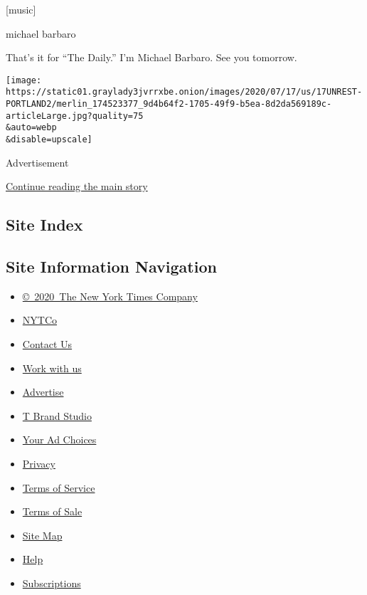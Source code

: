 {[}music{]}

michael barbaro

That's it for ``The Daily.'' I'm Michael Barbaro. See you tomorrow.

\texttt{[image: https://static01.graylady3jvrrxbe.onion/images/2020/07/17/us/17UNREST-PORTLAND2/merlin\_174523377\_9d4b64f2-1705-49f9-b5ea-8d2da569189c-articleLarge.jpg?quality=75\\\&auto=webp\\\&disable=upscale]}

Advertisement

\protect\hyperlink{after-bottom}{Continue reading the main story}

\hypertarget{site-index}{%
\subsection{Site Index}\label{site-index}}

\hypertarget{site-information-navigation}{%
\subsection{Site Information
Navigation}\label{site-information-navigation}}

\begin{itemize}
\tightlist
\item
  \href{https://help.nytimes3xbfgragh.onion/hc/en-us/articles/115014792127-Copyright-notice}{©~2020~The
  New York Times Company}
\end{itemize}

\begin{itemize}
\tightlist
\item
  \href{https://www.nytco.com/}{NYTCo}
\item
  \href{https://help.nytimes3xbfgragh.onion/hc/en-us/articles/115015385887-Contact-Us}{Contact
  Us}
\item
  \href{https://www.nytco.com/careers/}{Work with us}
\item
  \href{https://nytmediakit.com/}{Advertise}
\item
  \href{http://www.tbrandstudio.com/}{T Brand Studio}
\item
  \href{https://www.nytimes3xbfgragh.onion/privacy/cookie-policy\#how-do-i-manage-trackers}{Your
  Ad Choices}
\item
  \href{https://www.nytimes3xbfgragh.onion/privacy}{Privacy}
\item
  \href{https://help.nytimes3xbfgragh.onion/hc/en-us/articles/115014893428-Terms-of-service}{Terms
  of Service}
\item
  \href{https://help.nytimes3xbfgragh.onion/hc/en-us/articles/115014893968-Terms-of-sale}{Terms
  of Sale}
\item
  \href{https://spiderbites.nytimes3xbfgragh.onion}{Site Map}
\item
  \href{https://help.nytimes3xbfgragh.onion/hc/en-us}{Help}
\item
  \href{https://www.nytimes3xbfgragh.onion/subscription?campaignId=37WXW}{Subscriptions}
\end{itemize}
